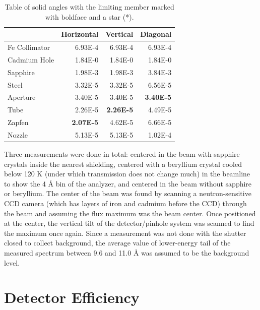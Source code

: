 \documentclass[5p,12pt]{elsarticle}
\begin{document}
\begin{table}
\scriptsize
\begin{center}
     \caption{Table of solid angles with the limiting member marked with boldface and a star (*).  \label{tab:sa} }
\begin{tabular}{|l|r|r|r|}
     \hline
                   &     Horizontal  &     Vertical   &     Diagonal   \\
     \hline
     Fe Collimator &     6.93E-4  &     6.93E-4 &     6.93E-4 \\
     \hline 
     Cadmium Hole  &     1.84E-0  &     1.84E-0 &     1.84E-0 \\
     \hline 
     Sapphire      &     1.98E-3  &     1.98E-3 &     3.84E-3 \\
     \hline 
     Steel         &     3.32E-5  &     3.32E-5 &     6.56E-5 \\
     \hline
     Aperture      &     3.40E-5  &     3.40E-5 &\bf* 3.40E-5 \\
     \hline
     Tube          &     2.26E-5  &\bf* 2.26E-5 &     4.49E-5  \\
     \hline
     Zapfen        &\bf* 2.07E-5  &     4.62E-5 &     6.66E-5 \\
     \hline
     Nozzle        &     5.13E-5  &     5.13E-5 &     1.02E-4 \\
     \hline
\end{tabular}
\end{center}
\end{table}

Three measurements were done in total: centered in the beam with sapphire crystals inside the nearest shielding, centered with a beryllium crystal cooled below 120 K (under which transmission does not change much) in the beamline to show the 4 {\AA} bin of the analyzer, and centered in the beam without sapphire or beryllium.  The center of the beam was found by scanning a neutron-sensitive CCD camera (which has layers of iron and cadmium before the CCD) through the beam and assuming the flux maximum was the beam center.  Once positioned at the center, the vertical tilt of the detector/pinhole system was scanned to find the maximum once again.  Since a measurement was not done with the shutter closed to collect background, the average value of lower-energy tail of the measured spectrum between 9.6 and 11.0 {\AA} was assumed to be the background level.

%
%
%
%
%

%
%
%
%
%


\section{Detector Efficiency}
\label{sec:eff}
\end{document}

